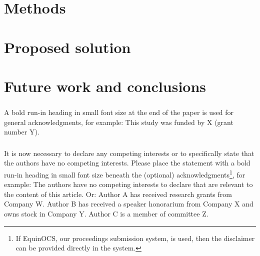 \documentclass[runningheads]{llncs}
\begin{document}

\section{Methods}
\label{sec:methods}


\section{Proposed solution}
\label{sec:solution}


\section{Future work and conclusions}
\label{sec:conclusions}

\begin{credits}
\subsubsection{\ackname} A bold run-in heading in small font size at the end of the paper is
used for general acknowledgments, for example: This study was funded
by X (grant number Y).

\subsubsection{\discintname}
It is now necessary to declare any competing interests or to specifically
state that the authors have no competing interests. Please place the
statement with a bold run-in heading in small font size beneath the
(optional) acknowledgments\footnote{If EquinOCS, our proceedings submission
system, is used, then the disclaimer can be provided directly in the system.},
for example: The authors have no competing interests to declare that are
relevant to the content of this article. Or: Author A has received research
grants from Company W. Author B has received a speaker honorarium from
Company X and owns stock in Company Y. Author C is a member of committee Z.
\end{credits}
%
%
%


%
\end{document}
